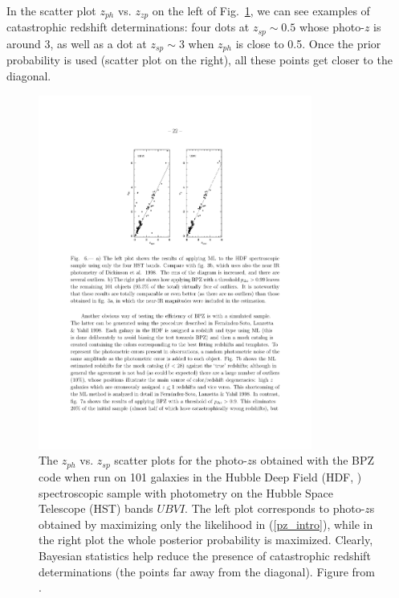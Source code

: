 In the scatter plot $z_{ph}$ vs. $z_{zp}$ on the left of Fig.~\ref{fig:prior}, we can see examples of catastrophic redshift determinations: four dots at $z_{sp}\sim 0.5$ whose photo-$z$ is around 3, as well as a dot at $z_{sp}\sim3$ when $z_{ph}$ is close to 0.5. Once the prior probability is used (scatter plot on the right), all these points get closer to the diagonal.
\begin{figure}
\centering
\includegraphics[width=90mm]{./plots/prior_catastrophic.pdf}
\caption{The $z_{ph}$ vs. $z_{sp}$ scatter plots for the photo-$z$s obtained with the BPZ code when run on 101 galaxies in the Hubble Deep Field (HDF, \citet{Williams1996}) spectroscopic sample with photometry on the Hubble Space Telescope (HST) bands $UBVI$. The left plot corresponds to photo-$z$s obtained by maximizing only the likelihood in (\ref{pz_intro}), while in the right plot the whole posterior probability is maximized. Clearly, Bayesian statistics help reduce the presence of catastrophic redshift determinations (the points far away from the diagonal). Figure from \citet{Benitez2000}.}
\label{fig:prior}
\end{figure}

